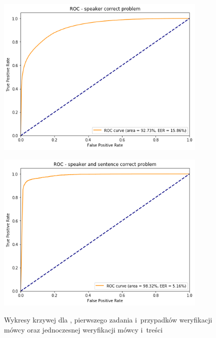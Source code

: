 \begin{figure}[H]
    \centering
    \begin{minipage}{.5\textwidth}
        \centering
        \includegraphics[width=0.9\textwidth]{images/4_3_hmm_roc_speaker}
        \label{fig:4_3_hmm_roc_speaker}
    \end{minipage}%
    \begin{minipage}{.5\textwidth}
        \centering
        \includegraphics[width=0.9\textwidth]{images/4_3_hmm_roc_both}
        \label{fig:4_3_hmm_roc_both}
    \end{minipage}
    \caption{Wykresy krzywej  dla , pierwszego zadania  i~przypadków weryfikacji mówcy oraz jednoczesnej weryfikacji mówcy i~treści}
\end{figure}

